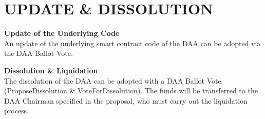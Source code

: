 \section{UPDATE \& DISSOLUTION}\label{sec:update-&-dissolution}

\item \textbf{Update of the Underlying Code} \\
An update of the underlying smart contract code of the DAA can be adopted via the DAA Ballot Vote.

\item \textbf{Dissolution \& Liquidation} \\
The dissolution of the DAA can be adopted with a DAA Ballot Vote (ProposeDissolution \& VoteForDissolution). %
The funds will be transferred to the DAA Chairman specified in the proposal, who must carry out the liquidation process.
